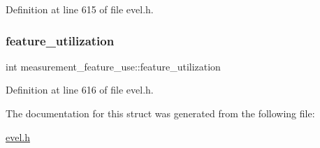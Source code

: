 Definition at line 615 of file evel.\+h.

\hypertarget{structmeasurement__feature__use_acfc02a6d8e005960701eca4389e5c222}{}\label{structmeasurement__feature__use_acfc02a6d8e005960701eca4389e5c222} 
\subsubsection{\texorpdfstring{feature\+\_\+utilization}{feature\_utilization}}
{\footnotesize\ttfamily int measurement\+\_\+feature\+\_\+use\+::feature\+\_\+utilization}



Definition at line 616 of file evel.\+h.



The documentation for this struct was generated from the following file\+:\begin{DoxyCompactItemize}
\item 
\hyperlink{evel_8h}{evel.\+h}\end{DoxyCompactItemize}
